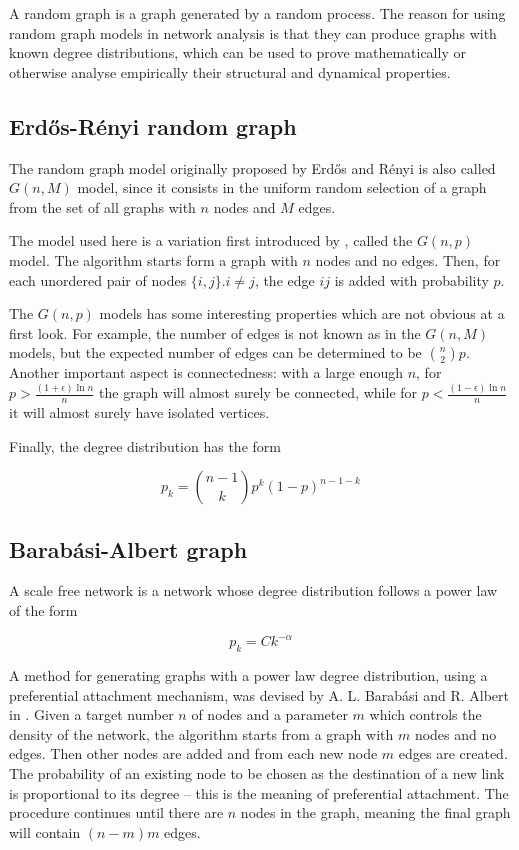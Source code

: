 \documentclass[a4paper,11pt,twoside,openright]{memoir}
\begin{document}
A random graph is a graph generated by a random process. The reason for
using random graph models in network analysis is that they can produce
graphs with known degree distributions, which can be used to prove
mathematically or otherwise analyse empirically their structural and
dynamical properties.

\subsection{Erd\H{o}s-Rényi random
graph}\label{erdos-renyi-random-graph}

The random graph model originally proposed by Erd\H{o}s and Rényi is
also called $G(n,M)$ model, since it consists in the uniform random
selection of a graph from the set of all graphs with $n$ nodes and $M$
edges.

The model used here is a variation first introduced by
\cite{gilbert_random_1959},
called the $G(n,p)$ model. The algorithm starts form a graph with $n$
nodes and no edges. Then, for each unordered pair of nodes
$\{i,j\} . i \neq j$, the edge $ij$ is added with probability $p$.

The $G(n,p)$ models has some interesting properties which are not
obvious at a first look. For example, the number of edges is not known
as in the $G(n,M)$ models, but the expected number of edges can be
determined to be $\binom{n}{2}p$. Another important aspect is
connectedness: with a large enough $n$,
for $p > \frac{(1+\epsilon) \ln n}{n}$ the graph will
almost surely be connected, while for $p < \frac{(1-\epsilon) \ln n}{n}$
it will almost surely have isolated vertices.

Finally, the degree distribution has the form

\begin{equation}
p_k = \binom{n-1}{k} p^k (1-p)^{n-1-k}
\end{equation}

\subsection{Barabási-Albert graph}\label{barabuxe1si-albert-graph}

A scale free network is a network whose degree distribution follows a
power law of the form

\begin{equation}
p_k = Ck^{-\alpha}
\end{equation}

A method for generating graphs with a power law degree distribution,
using a preferential attachment mechanism, was devised by A. L. Barabási
and R. Albert in \cite{barabasi_emergence_1999}. Given a target number $n$
of nodes and a
parameter $m$ which controls the density of the network, the algorithm
starts from a graph with $m$ nodes and no edges. Then other nodes are
added and from each new node $m$ edges are created. The probability of an
existing node to be chosen as the destination of a new link is proportional
to its degree -- this is the meaning of preferential attachment.
The procedure continues until there are $n$ nodes in the graph,
meaning the final graph will contain $(n-m) m$ edges.
\end{document}
